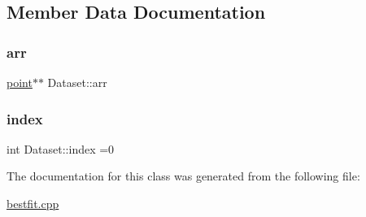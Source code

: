 \subsection{Member Data Documentation}
\mbox{\label{classDataset_acd70fa206d8b0a819a07a658f700f9bf}} 
\subsubsection{\texorpdfstring{arr}{arr}}
{\footnotesize\ttfamily \hyperlink{classpoint}{point}$\ast$$\ast$ Dataset\+::arr}

\mbox{\label{classDataset_aed9a6877e5e1483ea47d1f6e39e404f0}} 
\subsubsection{\texorpdfstring{index}{index}}
{\footnotesize\ttfamily int Dataset\+::index =0}



The documentation for this class was generated from the following file\+:\begin{DoxyCompactItemize}
\item 
\hyperlink{bestfit_8cpp}{bestfit.\+cpp}\end{DoxyCompactItemize}
